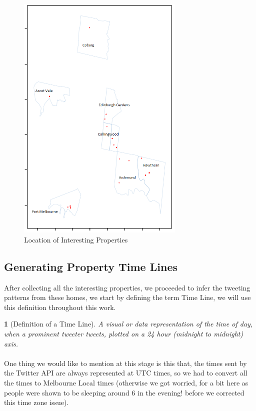 \documentclass[12pt]{report}
\theoremstyle{named}
\newtheorem*{namedtheorem}{}
\begin{document}
\begin{figure}[ht]
\centering
        \includegraphics[width=80mm,scale=1]{Images/FilteredInterestingProperties.png}
    \caption{Location of Interesting Properties}
    \label{fig:Location of Interesting Properties}
\end{figure}

\subsection{Generating Property Time Lines}
After collecting all the interesting properties, we proceeded to infer the tweeting patterns from these homes, we start by defining the term Time Line, we will use this definition throughout this work.
\begin{namedtheorem}[Definition of a Time Line] A visual or data representation of the time of day, when a prominent tweeter tweets, plotted on a 24 hour (midnight to midnight) axis.

\end{namedtheorem}
\paragraph{}
One thing we would like to mention at this stage is this that, the times sent by the Twitter API are always represented at UTC times, so we had to convert all the times to Melbourne Local times (otherwise we got worried, for a bit here as people were shown to be sleeping around 6 in the evening! before we corrected this time zone issue).
\end{document}
